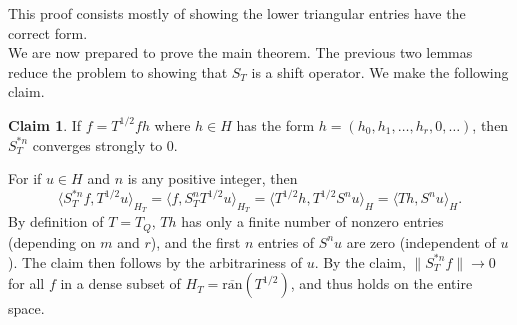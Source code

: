 \documentclass[12 pt]{article}
\theoremstyle{plain}
\theoremstyle{definition}
\newtheorem{claim}[theorem]{Claim}
\newcommand{\ip}[2]{\langle #1, #2\rangle}
\newcommand{\ran}{\text{ran}}
\begin{document}
\noindent This proof consists mostly of showing the lower triangular entries have the correct form. \\
We are now prepared to prove the main theorem. The previous two lemmas reduce the problem to showing that $S_T$ is a shift operator. We make the following claim.
\begin{claim}
If $f=T^{1/2}fh$ where $h\in H$ has the form $h=(h_0, h_1, \ldots , h_r, 0 ,\ldots)$, then $S_T^{*n}$ converges strongly to $0$. 
\end{claim}
For if $u\in H$ and $n$ is any positive integer, then 
\[\ip{S_T^{*n}f}{T^{1/2}u}_{H_T}=\ip{f}{S_T^{n}T^{1/2}u}_{H_T}=\ip{T^{1/2}h}{T^{1/2}S^nu}_H=\ip{Th}{S^nu}_H.\]
By definition of $T=T_Q$, $Th$ has only a finite number of nonzero entries (depending on $m$ and $r$), and the first $n$ entries of $S^nu$ are zero (independent of $u$). The claim then follows by the arbitrariness of $u$. By the claim, $\|S_T^{*n}f\|\rightarrow 0$ for all $f$ in a dense subset of $H_T=\overline{\ran}(T^{1/2})$, and thus holds on the entire space.
\end{document}
